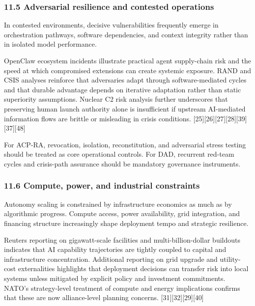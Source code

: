 \documentclass[11pt]{article}
\begin{document}
\hypertarget{adversarial-resilience-and-contested-operations}{%
\subsubsection{11.5 Adversarial resilience and contested
operations}\label{adversarial-resilience-and-contested-operations}}

In contested environments, decisive vulnerabilities frequently emerge in
orchestration pathways, software dependencies, and context integrity
rather than in isolated model performance.

OpenClaw ecosystem incidents illustrate practical agent supply-chain
risk and the speed at which compromised extensions can create systemic
exposure. RAND and CSIS analyses reinforce that adversaries adapt
through software-mediated cycles and that durable advantage depends on
iterative adaptation rather than static superiority assumptions. Nuclear
C2 risk analysis further underscores that preserving human launch
authority alone is insufficient if upstream AI-mediated information
flows are brittle or misleading in crisis conditions.
{[}25{]}{[}26{]}{[}27{]}{[}28{]}{[}39{]}{[}37{]}{[}48{]}

For ACP-RA, revocation, isolation, reconstitution, and adversarial
stress testing should be treated as core operational controls. For DAD,
recurrent red-team cycles and crisis-path assurance should be mandatory
governance instruments.

\hypertarget{compute-power-and-industrial-constraints}{%
\subsubsection{11.6 Compute, power, and industrial
constraints}\label{compute-power-and-industrial-constraints}}

Autonomy scaling is constrained by infrastructure economics as much as
by algorithmic progress. Compute access, power availability, grid
integration, and financing structure increasingly shape deployment tempo
and strategic resilience.

Reuters reporting on gigawatt-scale facilities and multi-billion-dollar
buildouts indicates that AI capability trajectories are tightly coupled
to capital and infrastructure concentration. Additional reporting on
grid upgrade and utility-cost externalities highlights that deployment
decisions can transfer risk into local systems unless mitigated by
explicit policy and investment commitments. NATO's strategy-level
treatment of compute and energy implications confirms that these are now
alliance-level planning concerns. {[}31{]}{[}32{]}{[}29{]}{[}40{]}
\end{document}
